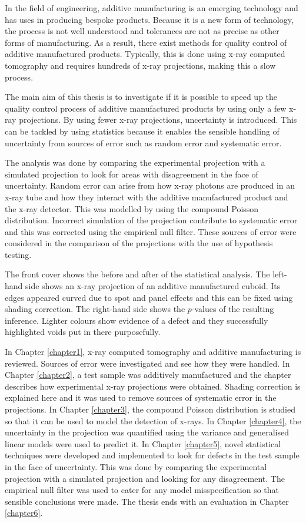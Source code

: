 \documentclass[12pt, a4paper, oneside]{memoir}
\begin{document}
In the field of engineering, additive manufacturing is an emerging technology and has uses in producing bespoke products. Because it is a new form of technology, the process is not well understood and tolerances are not as precise as other forms of manufacturing. As a result, there exist methods for quality control of additive manufactured products. Typically, this is done using x-ray computed tomography and requires hundreds of x-ray projections, making this a slow process.

The main aim of this thesis is to investigate if it is possible to speed up the quality control process of additive manufactured products by using only a few x-ray projections. By using fewer x-ray projections, uncertainty is introduced. This can be tackled by using statistics because it enables the sensible handling of uncertainty from sources of error such as random error and systematic error.

The analysis was done by comparing the experimental projection with a simulated projection to look for areas with disagreement in the face of uncertainty. Random error can arise from how x-ray photons are produced in an x-ray tube and how they interact with the additive manufactured product and the x-ray detector. This was modelled by using the compound Poisson distribution. Incorrect simulation of the projection contribute to systematic error and this was corrected using the empirical null filter. These sources of error were considered in the comparison of the projections with the use of hypothesis testing.

The front cover shows the before and after of the statistical analysis. The left-hand side shows an x-ray projection of an additive manufactured cuboid. Its edges appeared curved due to spot and panel effects and this can be fixed using shading correction. The right-hand side shows the $p$-values of the resulting inference. Lighter colours show evidence of a defect and they successfully highlighted voids put in there purposefully.

In Chapter \ref{chapter1}, x-ray computed tomography and additive manufacturing is reviewed. Sources of error were investigated and see how they were handled. In Chapter \ref{chapter2}, a test sample was additively manufactured and the chapter describes how experimental x-ray projections were obtained. Shading correction is explained here and it was used to remove sources of systematic error in the projections. In Chapter \ref{chapter3}, the compound Poisson distribution is studied so that it can be used to model the detection of x-rays. In Chapter \ref{chapter4}, the uncertainty in the projection was quantified using the variance and generalised linear models were used to predict it. In Chapter \ref{chapter5}, novel statistical techniques were developed and implemented to look for defects in the test sample in the face of uncertainty. This was done by comparing the experimental projection with a simulated projection and looking for any disagreement. The empirical null filter was used to cater for any model misspecification so that sensible conclusions were made. The thesis ends with an evaluation in Chapter \ref{chapter6}.
\end{document}
